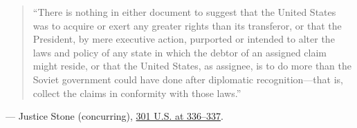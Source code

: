 \documentclass[12pt]{article}
\begin{document}
\begin{quote}
``There is nothing in either document to suggest that the United States was to acquire or exert any greater rights than its transferor, or that the President, by mere executive action, purported or intended to alter the laws and policy of any state in which the debtor of an assigned claim might reside, or that the United States, as assignee, is to do more than the Soviet government could have done after diplomatic recognition---that is, collect the claims in conformity with those laws.''
\end{quote}
\noindent --- Justice Stone (concurring), \href{https://www.law.cornell.edu/supremecourt/text/301/324}{301 U.S. at 336--337}.
\end{document}
